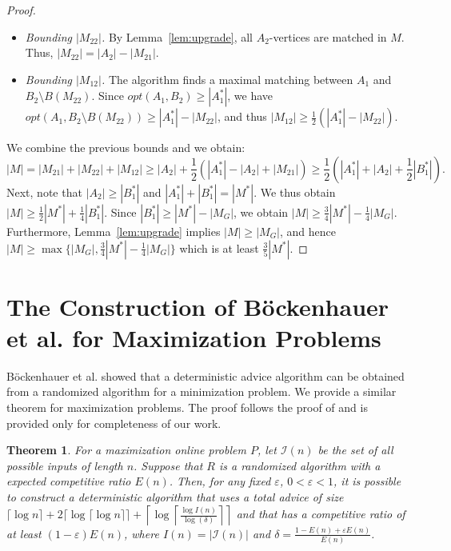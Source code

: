 \documentclass[a4paper]{article}
\newcommand{\eps}{\varepsilon}
\newtheorem{theorem}{Theorem}
\begin{document}
\begin{proof}
\begin{itemize}
 \item \textit{Bounding $|M_{22}|$.} By Lemma~\ref{lem:upgrade}, all $A_2$-vertices are matched in $M$. Thus,
 $|M_{22}| = |A_2| - |M_{21}|.$

 \item \textit{Bounding $|M_{12}|$.} The algorithm finds a maximal matching between $A_1$ and
 $B_2 \setminus B(M_{22})$. Since $opt(A_1, B_2) \ge |A_1^*|$, we have
 $opt(A_1, B_2 \setminus B(M_{22}) ) \ge |A_1^*| - |M_{22}|$,
 and thus $|M_{12}| \ge \frac{1}{2} ( |A_1^*| - |M_{22}| ).$
 \end{itemize}

\noindent We combine the previous bounds and we obtain:
 $$
|M| = |M_{21}| + |M_{22}| + |M_{12}| \ge
|A_2| + \frac{1}{2} ( |A_1^*| - |A_2| + |M_{21}| ) \ge \frac{1}{2} ( |A_1^*| + |A_2| + \frac{1}{2} |B_1^*| ).
 $$
Next, note that $|A_2| \ge |B_1^*|$ and $|A_1^*| + |B_1^*| = |M^*|$. We thus
obtain $|M| \ge \frac{1}{2} |M^*| + \frac{1}{4} |B_1^*|$. Since
$|B_1^*| \ge |M^*| - |M_G|$, we obtain $|M| \ge \frac{3}{4} |M^*| - \frac{1}{4} |M_G|$. Furthermore,
Lemma~\ref{lem:upgrade} implies $|M| \ge |M_G|$, and hence
$|M| \ge \max \{ |M_G|, \frac{3}{4} |M^*| - \frac{1}{4} |M_G| \}$ which is at least $\frac{3}{5} |M^*|$.
\end{proof}





\newpage
\appendix


\section{The Construction of B\"{o}ckenhauer et al. for Maximization Problems}
\label{appendix:boeckenhauer}

B\"{o}ckenhauer et al. \cite{bkkk11} showed that a deterministic advice algorithm can be obtained
from a randomized algorithm for a minimization problem. We provide a similar theorem for maximization
problems. The proof follows the proof of \cite{bkkk11} and is provided only for completeness of our work.
\label{sec:min-to-max}
\begin{theorem}
  For a maximization online problem $P$, let $\mathcal{I}(n)$ be the set of all possible inputs of
  length $n$. Suppose that $R$ is a randomized algorithm with a expected competitive ratio
  $E(n)$. Then, for any fixed $\eps$, $0 < \eps < 1$, it is possible to construct a deterministic
  algorithm that uses a total advice of size
  $\lceil \log n \rceil + 2 \lceil \log \lceil \log n \rceil \rceil + \left \lceil \log \left\lceil\frac{\log I(n)}{\log (\delta)}\right\rceil \right\rceil$ and that has a competitive ratio of at least
  $(1 - \eps)E(n)$, where $I(n) = |\mathcal{I}(n)|$ and $\delta = \frac{1-E(n)+\eps E(n)}{E(n)}$.
\end{theorem}
\end{document}
